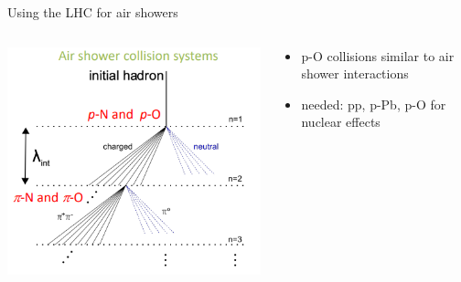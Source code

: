 \documentclass[aspectratio=1610, 9pt]{beamer}
\begin{document}
\begin{frame}{Using the LHC for air showers}
  \begin{columns}
    \begin{column}[c]{0.48\textwidth}
      \includegraphics[width=\textwidth]{plots/lhc_shower.png}
    \end{column}
    \begin{column}[c]{0.48\textwidth}
      \begin{itemize}
        \item p-O collisions similar to air shower interactions
        \item needed: pp, p-Pb, p-O for nuclear effects
      \end{itemize}
    \end{column}
  \end{columns}
\end{frame}
\end{document}
